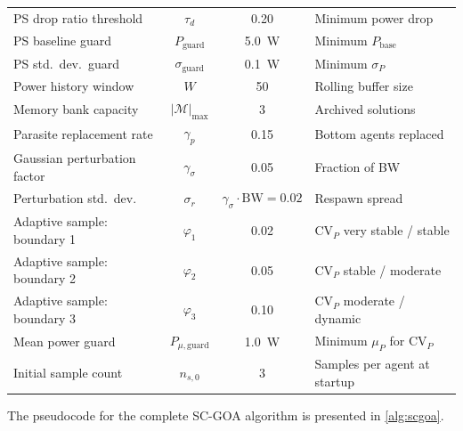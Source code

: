 \documentclass[a4paper, 12pt]{article}
\begin{document}
\begin{table}[htbp]
\begin{tabular}{@{} l c c l @{}}
PS drop ratio threshold & $\tau_d$ & 0.20 & Minimum power drop \\
PS baseline guard & $P_{\mathrm{guard}}$ & 5.0~W & Minimum $P_{\mathrm{base}}$ \\
PS std.\ dev.\ guard & $\sigma_{\mathrm{guard}}$ & 0.1~W & Minimum $\sigma_P$ \\
\midrule
Power history window & $W$ & 50 & Rolling buffer size \\
Memory bank capacity & $|\mathcal{M}|_{\max}$ & 3 & Archived solutions \\
Parasite replacement rate & $\gamma_p$ & 0.15 & Bottom agents replaced \\
Gaussian perturbation factor & $\gamma_\sigma$ & 0.05 & Fraction of BW \\
Perturbation std.\ dev. & $\sigma_r$ & $\gamma_\sigma \cdot \mathrm{BW} = 0.02$ & Respawn spread \\
\midrule
Adaptive sample: boundary 1 & $\varphi_1$ & 0.02 & $\mathrm{CV}_P$ very stable / stable \\
Adaptive sample: boundary 2 & $\varphi_2$ & 0.05 & $\mathrm{CV}_P$ stable / moderate \\
Adaptive sample: boundary 3 & $\varphi_3$ & 0.10 & $\mathrm{CV}_P$ moderate / dynamic \\
Mean power guard & $P_{\mu,\mathrm{guard}}$ & 1.0~W & Minimum $\mu_P$ for $\mathrm{CV}_P$ \\
Initial sample count & $n_{s,0}$ & 3 & Samples per agent at startup \\
\bottomrule
\end{tabular}
\end{table}

The pseudocode for the complete SC-GOA algorithm is presented in \cref{alg:scgoa}.

\clearpage   %
\end{document}
